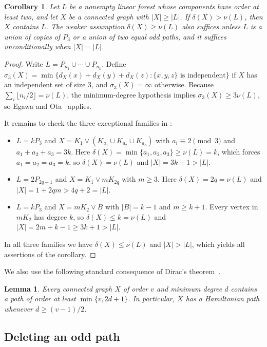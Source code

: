\documentclass[10pt]{article}
\theoremstyle{compactplain}
\newtheorem{lemma}[theorem]{Lemma}
\newtheorem{corollary}[theorem]{Corollary}
\theoremstyle{remark}\newtheorem{remark}[theorem]{Remark}
\begin{document}
\begin{corollary}\label{cor:min-deg-embed}
Let $L$ be a nonempty linear forest whose components have order at least
two, and let $X$ be a connected graph with $|X|\ge|L|$. If
$\delta(X)>\nu(L)$, then $X$ contains $L$. The weaker assumption
$\delta(X)\ge\nu(L)$ also suffices unless $L$ is a union of copies of
$P_3$ or a union of two equal odd paths, and it suffices unconditionally
when $|X|=|L|$.
\end{corollary}
\begin{proof}
Write $L=P_{n_1}\cup\cdots\cup P_{n_k}$. Define
$\sigma_3(X)=\min\{d_X(x)+d_X(y)+d_X(z):\{x,y,z\}\text{ is independent}\}$
if $X$ has an independent set of size $3$, and $\sigma_3(X)=\infty$
otherwise. Because $\sum_i\lfloor n_i/2\rfloor=\nu(L)$, the
minimum-degree hypothesis implies $\sigma_3(X)\ge3\nu(L)$, so Egawa and
Ota~\cite[Theorem~1]{EO} applies.

It remains to check the three exceptional families in \cite{EO}:
\begin{itemize}
\item $L=kP_3$ and $X=K_1\vee(K_{a_1}\cup K_{a_2}\cup K_{a_3})$ with
$a_i\equiv2\pmod{3}$ and $a_1+a_2+a_3=3k$. Here
$\delta(X)=\min\{a_1,a_2,a_3\}\ge\nu(L)=k$, which forces
$a_1=a_2=a_3=k$, so $\delta(X)=\nu(L)$ and $|X|=3k+1>|L|$.
\item $L=2P_{2q+1}$ and $X=K_1\vee mK_{2q}$ with $m\ge3$. Here
$\delta(X)=2q=\nu(L)$ and $|X|=1+2qm>4q+2=|L|$.
\item $L=kP_3$ and $X=mK_2\vee B$ with $|B|=k-1$ and $m\ge k+1$. Every
vertex in $mK_2$ has degree $k$, so $\delta(X)\le k=\nu(L)$ and
$|X|=2m+k-1\ge3k+1>|L|$.
\end{itemize}
In all three families we have $\delta(X)\le\nu(L)$ and $|X|>|L|$, which
yields all assertions of the corollary.
\end{proof}

We also use the following standard consequence of Dirac's
theorem~\cite{Dirac}.

\begin{lemma}\label{lem:dirac-path}
Every connected graph $X$ of order $v$ and minimum degree $d$ contains a
path of order at least $\min\{v,2d+1\}$. In particular, $X$ has a
Hamiltonian path whenever $d\ge(v-1)/2$.
\end{lemma}

\subsection{Deleting an odd path}
\end{document}
